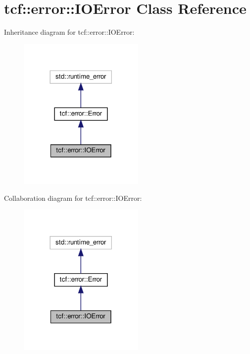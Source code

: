 \hypertarget{classtcf_1_1error_1_1IOError}{}\section{tcf\+:\+:error\+:\+:I\+O\+Error Class Reference}
\label{classtcf_1_1error_1_1IOError}


Inheritance diagram for tcf\+:\+:error\+:\+:I\+O\+Error\+:
\nopagebreak
\begin{figure}[H]
\begin{center}
\leavevmode
\includegraphics[width=173pt]{classtcf_1_1error_1_1IOError__inherit__graph}
\end{center}
\end{figure}


Collaboration diagram for tcf\+:\+:error\+:\+:I\+O\+Error\+:
\nopagebreak
\begin{figure}[H]
\begin{center}
\leavevmode
\includegraphics[width=173pt]{classtcf_1_1error_1_1IOError__coll__graph}
\end{center}
\end{figure}
